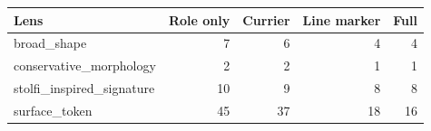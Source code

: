 {\small
\begin{tabular}{lrrrr}
\toprule
Lens & Role only & Currier & Line marker & Full \\
\midrule
broad\_shape & 7 & 6 & 4 & 4 \\
conservative\_morphology & 2 & 2 & 1 & 1 \\
stolfi\_inspired\_signature & 10 & 9 & 8 & 8 \\
surface\_token & 45 & 37 & 18 & 16 \\
\bottomrule
\end{tabular}
}
